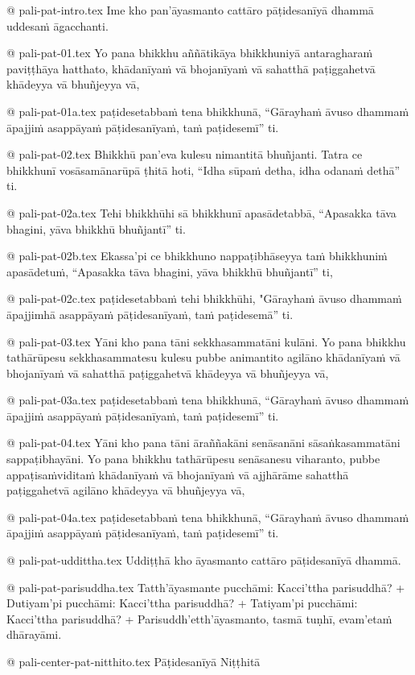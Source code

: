 @ pali-pat-intro.tex
Ime kho pan’āyasmanto cattāro pāṭidesanīyā dhammā uddesaṁ āgacchanti.

@ pali-pat-01.tex
Yo pana bhikkhu aññātikāya bhikkhuniyā antaragharaṁ paviṭṭhāya hatthato, khādanīyaṁ vā bhojanīyaṁ vā sahatthā paṭiggahetvā khādeyya vā bhuñjeyya vā,

@ pali-pat-01a.tex
paṭidesetabbaṁ tena bhikkhunā, “Gārayhaṁ āvuso dhammaṁ āpajjiṁ asappāyaṁ pāṭidesanīyaṁ, taṁ paṭidesemī” ti.

@ pali-pat-02.tex
Bhikkhū pan’eva kulesu nimantitā bhuñjanti. Tatra ce bhikkhunī vosāsamānarūpā ṭhitā hoti, “Idha sūpaṁ detha, idha odanaṁ dethā” ti.

@ pali-pat-02a.tex
Tehi bhikkhūhi sā bhikkhunī apasādetabbā, “Apasakka tāva bhagini, yāva bhikkhū bhuñjantī” ti.

@ pali-pat-02b.tex
Ekassa’pi ce bhikkhuno nappaṭibhāseyya taṁ bhikkhuniṁ apasādetuṁ, “Apasakka tāva bhagini, yāva bhikkhū bhuñjantī” ti,

@ pali-pat-02c.tex
paṭidesetabbaṁ tehi bhikkhūhi, "Gārayhaṁ āvuso dhammaṁ āpajjimhā asappāyaṁ pāṭidesanīyaṁ, taṁ paṭidesemā” ti.

@ pali-pat-03.tex
Yāni kho pana tāni sekkhasammatāni kulāni. Yo pana bhikkhu tathārūpesu sekkhasammatesu kulesu pubbe animantito agilāno khādanīyaṁ vā bhojanīyaṁ vā sahatthā paṭiggahetvā khādeyya vā bhuñjeyya vā,

@ pali-pat-03a.tex
paṭidesetabbaṁ tena bhikkhunā, “Gārayhaṁ āvuso dhammaṁ āpajjiṁ asappāyaṁ pāṭidesanīyaṁ, taṁ paṭidesemī” ti.

@ pali-pat-04.tex
Yāni kho pana tāni āraññakāni senāsanāni sāsaṅkasammatāni sappaṭibhayāni. Yo pana bhikkhu tathārūpesu senāsanesu viharanto, pubbe appaṭisaṁviditaṁ khādanīyaṁ vā bhojanīyaṁ vā ajjhārāme sahatthā paṭiggahetvā agilāno khādeyya vā bhuñjeyya vā,

@ pali-pat-04a.tex
paṭidesetabbaṁ tena bhikkhunā, “Gārayhaṁ āvuso dhammaṁ āpajjiṁ asappāyaṁ pāṭidesanīyaṁ, taṁ paṭidesemī” ti.

@ pali-pat-uddittha.tex
Uddiṭṭhā kho āyasmanto cattāro pāṭidesanīyā dhammā.

@ pali-pat-parisuddha.tex
Tatth’āyasmante pucchāmi: Kacci’ttha parisuddhā? +
Dutiyam’pi pucchāmi: Kacci’ttha parisuddhā? +
Tatiyam’pi pucchāmi: Kacci’ttha parisuddhā? +
Parisuddh’etth’āyasmanto, tasmā tuṇhī, evam’etaṁ dhārayāmi.

@ pali-center-pat-nitthito.tex
Pāṭidesanīyā Niṭṭhitā
